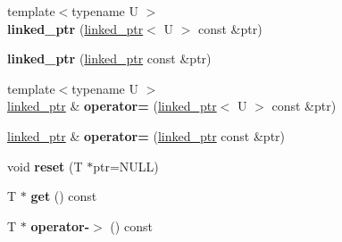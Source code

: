 \begin{DoxyCompactItemize}
\item 
\hypertarget{classtesting_1_1internal_1_1linked__ptr_a7597ed91006edd0467c99bd1aaab07f5}{}{\footnotesize template$<$typename U $>$ }\\{\bfseries linked\+\_\+ptr} (\hyperlink{classtesting_1_1internal_1_1linked__ptr}{linked\+\_\+ptr}$<$ U $>$ const \&ptr)\label{classtesting_1_1internal_1_1linked__ptr_a7597ed91006edd0467c99bd1aaab07f5}

\item 
\hypertarget{classtesting_1_1internal_1_1linked__ptr_abc076b5678cc7f64306d5ecfefc93aff}{}{\bfseries linked\+\_\+ptr} (\hyperlink{classtesting_1_1internal_1_1linked__ptr}{linked\+\_\+ptr} const \&ptr)\label{classtesting_1_1internal_1_1linked__ptr_abc076b5678cc7f64306d5ecfefc93aff}

\item 
\hypertarget{classtesting_1_1internal_1_1linked__ptr_a82608d98869b750d9ab729f1450a9a45}{}{\footnotesize template$<$typename U $>$ }\\\hyperlink{classtesting_1_1internal_1_1linked__ptr}{linked\+\_\+ptr} \& {\bfseries operator=} (\hyperlink{classtesting_1_1internal_1_1linked__ptr}{linked\+\_\+ptr}$<$ U $>$ const \&ptr)\label{classtesting_1_1internal_1_1linked__ptr_a82608d98869b750d9ab729f1450a9a45}

\item 
\hypertarget{classtesting_1_1internal_1_1linked__ptr_a1f40b5e66e6cf7b661ea116c806f952e}{}\hyperlink{classtesting_1_1internal_1_1linked__ptr}{linked\+\_\+ptr} \& {\bfseries operator=} (\hyperlink{classtesting_1_1internal_1_1linked__ptr}{linked\+\_\+ptr} const \&ptr)\label{classtesting_1_1internal_1_1linked__ptr_a1f40b5e66e6cf7b661ea116c806f952e}

\item 
\hypertarget{classtesting_1_1internal_1_1linked__ptr_a95ba3b7b66ed0193c779976c6e126ab6}{}void {\bfseries reset} (T $\ast$ptr=N\+U\+L\+L)\label{classtesting_1_1internal_1_1linked__ptr_a95ba3b7b66ed0193c779976c6e126ab6}

\item 
\hypertarget{classtesting_1_1internal_1_1linked__ptr_a6ea8584d9bcad13c3266834f5ce5e771}{}T $\ast$ {\bfseries get} () const \label{classtesting_1_1internal_1_1linked__ptr_a6ea8584d9bcad13c3266834f5ce5e771}

\item 
\hypertarget{classtesting_1_1internal_1_1linked__ptr_aa878c3e874242fb3cd2aa14ec603aa25}{}T $\ast$ {\bfseries operator-\/$>$} () const \label{classtesting_1_1internal_1_1linked__ptr_aa878c3e874242fb3cd2aa14ec603aa25}


\end{DoxyCompactItemize}
